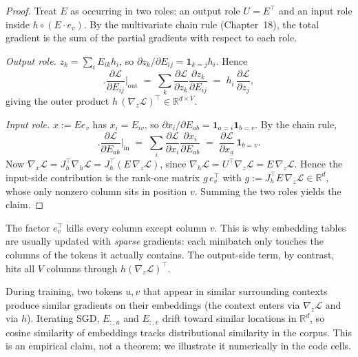 \begin{proof}
Treat $E$ as occurring in two roles: an output role $U=E^\top$ and an input role inside $h\circ(E\cdot e_v)$. By the multivariate chain rule (Chapter~18), the total gradient is the sum of the partial gradients with respect to each role.

\emph{Output role.} $z_k=\sum_i E_{ik}h_i$, so $\partial z_k/\partial E_{ij}=\mathbf{1}_{k=j}h_i$. Hence
\[
\Big.\frac{\partial\mathcal{L}}{\partial E_{ij}}\Big|_{\text{out}} \;=\; \sum_k \frac{\partial\mathcal{L}}{\partial z_k}\frac{\partial z_k}{\partial E_{ij}} \;=\; h_i\,\frac{\partial\mathcal{L}}{\partial z_j},
\]
giving the outer product $h\,(\nabla_z\mathcal{L})^\top\in\mathbb{R}^{d\times V}$.

\emph{Input role.} $x:=E e_v$ has $x_i=E_{iv}$, so $\partial x_i/\partial E_{ab}=\mathbf{1}_{a=i}\mathbf{1}_{b=v}$. By the chain rule,
\[
\Big.\frac{\partial\mathcal{L}}{\partial E_{ab}}\Big|_{\text{in}} \;=\; \sum_i \frac{\partial\mathcal{L}}{\partial x_i}\frac{\partial x_i}{\partial E_{ab}} \;=\; \frac{\partial\mathcal{L}}{\partial x_a}\,\mathbf{1}_{b=v}.
\]
Now $\nabla_x\mathcal{L} = J_h^\top\nabla_h\mathcal{L} = J_h^\top(E\,\nabla_z\mathcal{L})$, since $\nabla_h\mathcal{L}=U^\top\nabla_z\mathcal{L}=E\,\nabla_z\mathcal{L}$. Hence the input-side contribution is the rank-one matrix $g\,e_v^\top$ with $g:=J_h^\top E\,\nabla_z\mathcal{L}\in\mathbb{R}^d$, whose only nonzero column sits in position $v$. Summing the two roles yields the claim.
\end{proof}

\begin{remark}
The factor $e_v^\top$ kills every column except column $v$. This is why embedding tables are usually updated with \emph{sparse} gradients: each minibatch only touches the columns of the tokens it actually contains. The output-side term, by contrast, hits all $V$ columns through $h(\nabla_z\mathcal{L})^\top$.
\end{remark}

\begin{remark}
During training, two tokens $u,v$ that appear in similar surrounding contexts produce similar gradients on their embeddings (the context enters via $\nabla_z\mathcal{L}$ and via $h$). Iterating SGD, $E_{:,u}$ and $E_{:,v}$ drift toward similar locations in $\mathbb{R}^d$, so cosine similarity of embeddings tracks distributional similarity in the corpus. This is an empirical claim, not a theorem; we illustrate it numerically in the code cells.
\end{remark}

